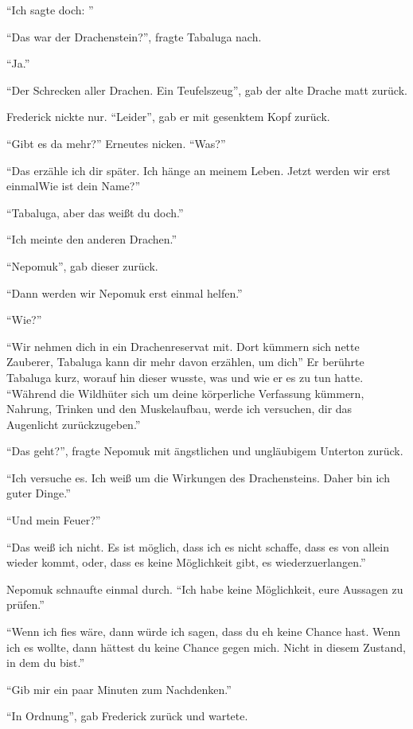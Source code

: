 \enquote{Ich sagte doch: }

\enquote{Das war der Drachenstein?}, fragte Tabaluga nach.

\enquote{Ja.}

\enquote{Der Schrecken aller Drachen. Ein Teufelszeug}, gab der alte Drache matt zurück.

Frederick nickte nur. \enquote{Leider}, gab er mit gesenktem Kopf zurück.

\enquote{Gibt es da mehr?} Erneutes nicken. \enquote{Was?}

\enquote{Das erzähle ich dir später. Ich hänge an meinem Leben. Jetzt werden wir erst einmal\abs Wie ist dein Name?}

\enquote{Tabaluga, aber das weißt du doch.}

\enquote{Ich meinte den anderen Drachen.}

\enquote{Nepomuk}, gab dieser zurück.

\enquote{Dann werden wir Nepomuk erst einmal helfen.}

\enquote{Wie?}

\enquote{Wir nehmen dich in ein Drachenreservat mit. Dort kümmern sich nette Zauberer, Tabaluga kann dir mehr davon erzählen, um dich\abs} Er berührte Tabaluga kurz, worauf hin dieser wusste, was und wie er es zu tun hatte. \enquote{Während die Wildhüter sich um deine körperliche Verfassung kümmern, Nahrung, Trinken und den Muskelaufbau, werde ich versuchen, dir das Augenlicht zurückzugeben.}

\enquote{Das geht?}, fragte Nepomuk mit ängstlichen und ungläubigem Unterton zurück.

\enquote{Ich versuche es. Ich weiß um die Wirkungen des Drachensteins. Daher bin ich guter Dinge.}

\enquote{Und mein Feuer?}

\enquote{Das weiß ich nicht. Es ist möglich, dass ich es nicht schaffe, dass es von allein wieder kommt, oder, dass es keine Möglichkeit gibt, es wiederzuerlangen.}

Nepomuk schnaufte einmal durch. \enquote{Ich habe keine Möglichkeit, eure Aussagen zu prüfen.}

\enquote{Wenn ich fies wäre, dann würde ich sagen, dass du eh keine Chance hast. Wenn ich es wollte, dann hättest du keine Chance gegen mich. Nicht in diesem Zustand, in dem du bist.}

\enquote{Gib mir ein paar Minuten zum Nachdenken.}

\enquote{In Ordnung}, gab Frederick zurück und wartete.


